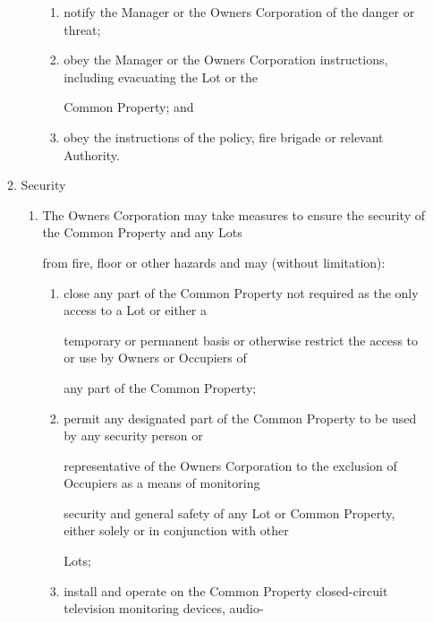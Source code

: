 \documentclass{article}
\begin{document}
\begin{enumerate}[label=\arabic*.]
\begin{enumerate}[label=\arabic{enumi}.\arabic*.]
\begin{enumerate}[label=(\arabic*)]
\begin{enumerate}[label=(\alph*)]
\item {\fontsize{9.962}{1} notify the Manager or the Owners Corporation of the danger or threat; }

\item {\fontsize{9.962}{1} obey the Manager or the Owners Corporation instructions, including evacuating the Lot or the }

{\fontsize{10.02}{1}Common Property; and }

\item {\fontsize{9.962}{1} obey the instructions of the policy, fire brigade or relevant Authority. }

\end{enumerate}
\end{enumerate}
\item {\fontsize{9.99}{1} Security }

\begin{enumerate}[label=(\arabic*)]
\item {\fontsize{9.962}{1} The Owners Corporation may take measures to ensure the security of the Common Property and any Lots }

{\fontsize{10.02}{1}from fire, floor or other hazards and may (without limitation): }

\begin{enumerate}[label=(\alph*)]
\item {\fontsize{9.962}{1} close any part of the Common Property not required as the only access to a Lot or either a }

{\fontsize{10.02}{1}temporary or permanent basis or otherwise restrict the access to or use by Owners or Occupiers of }

{\fontsize{10.02}{1}any part of the Common Property; }

\item {\fontsize{9.962}{1} permit any designated part of the Common Property to be used by any security person or }

{\fontsize{10.02}{1}representative of the Owners Corporation to the exclusion of Occupiers as a means of monitoring }

{\fontsize{10.02}{1}security and general safety of any Lot or Common Property, either solely or in conjunction with other }

{\fontsize{10.02}{1}Lots; }

\item {\fontsize{9.962}{1} install and operate on the Common Property closed-circuit television monitoring devices, audio- }


\end{enumerate}
\end{enumerate}
\end{enumerate}
\end{enumerate}
\end{document}
